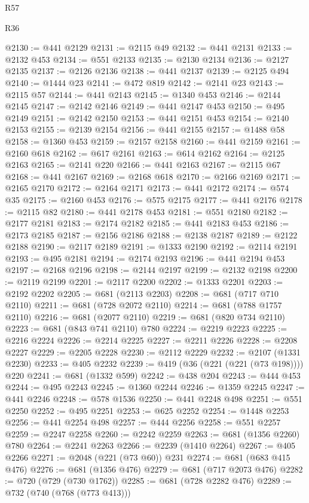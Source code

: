 \begin{lexlean}{R57}
\begin{lexlean}{R36}
\begin{coremodule}
{{{{{{{{{{{{{{{{{{{{{{{{{{{{{{{{{{{{{{{{{{{{{{{{{{{{{{{{{{{{{{{{{{{{{{{{{{{{{{{{{{@2130 := @441 @2129
@2131 := @2115 @49
@2132 := @441 @2131
@2133 := @2132 @453
@2134 := @551 @2133
@2135 := @2130 @2134
@2136 := @2127 @2135
@2137 := @2126 @2136
@2138 := @441 @2137
@2139 := @2125 @494
@2140 := @1444 @23
@2141 := @472 @819
@2142 := @2141 @23
@2143 := @2115 @57
@2144 := @441 @2143
@2145 := @1340 @453
@2146 := @2144 @2145
@2147 := @2142 @2146
@2149 := @441 @2147 @453
@2150 := @495 @2149
@2151 := @2142 @2150
@2153 := @441 @2151 @453
@2154 := @2140 @2153
@2155 := @2139 @2154
@2156 := @441 @2155
@2157 := @1488 @58
@2158 := @1360 @453
@2159 := @2157 @2158
@2160 := @441 @2159
@2161 := @2160 @618
@2162 := @617 @2161
@2163 := @614 @2162
@2164 := @2125 @2163
@2165 := @2141 @220
@2166 := @441 @2163
@2167 := @2115 @67
@2168 := @441 @2167
@2169 := @2168 @618
@2170 := @2166 @2169
@2171 := @2165 @2170
@2172 := @2164 @2171
@2173 := @441 @2172
@2174 := @574 @35
@2175 := @2160 @453
@2176 := @575 @2175
@2177 := @441 @2176
@2178 := @2115 @82
@2180 := @441 @2178 @453
@2181 := @551 @2180
@2182 := @2177 @2181
@2183 := @2174 @2182
@2185 := @441 @2183 @453
@2186 := @2173 @2185
@2187 := @2156 @2186
@2188 := @2138 @2187
@2189 := @2122 @2188
@2190 := @2117 @2189
@2191 := @1333 @2190
@2192 := @2114 @2191
@2193 := @495 @2181
@2194 := @2174 @2193
@2196 := @441 @2194 @453
@2197 := @2168 @2196
@2198 := @2144 @2197
@2199 := @2132 @2198
@2200 := @2119 @2199
@2201 := @2117 @2200
@2202 := @1333 @2201
@2203 := @2192 @2202
@2205 := @681 (@2113 @2203)
@2208 := @681 (@717 @710 @2110)
@2211 := @681 (@728 @2072 @2110)
@2214 := @681 (@788 @1757 @2110)
@2216 := @681 (@2077 @2110)
@2219 := @681 (@820 @734 @2110)
@2223 := @681 (@843 @741 @2110) @780
@2224 := @2219 @2223
@2225 := @2216 @2224
@2226 := @2214 @2225
@2227 := @2211 @2226
@2228 := @2208 @2227
@2229 := @2205 @2228
@2230 := @2112 @2229
@2232 := @2107 (@1331 @2230)
@2233 := @405 @2232
@2239 := @419 (@36 (@221 (@221 (@73 @198)))) @220
@2241 := @681 (@1332 @599)
@2242 := @438 @204
@2243 := @444 @453
@2244 := @495 @2243
@2245 := @1360 @2244
@2246 := @1359 @2245
@2247 := @441 @2246
@2248 := @578 @1536
@2250 := @441 @2248 @498
@2251 := @551 @2250
@2252 := @495 @2251
@2253 := @625 @2252
@2254 := @1448 @2253
@2256 := @441 @2254 @498
@2257 := @444 @2256
@2258 := @551 @2257
@2259 := @2247 @2258
@2260 := @2242 @2259
@2263 := @681 (@1356 @2260) @780
@2264 := @2241 @2263
@2266 := @2239 (@1410 @2264)
@2267 := @405 @2266
@2271 := @2048 (@221 (@73 @60)) @231
@2274 := @681 (@683 @415 @476)
@2276 := @681 (@1356 @476)
@2279 := @681 (@717 @2073 @476)
@2282 := @720 (@729 (@730 @1762))
@2285 := @681 (@728 @2282 @476)
@2289 := @732 (@740 (@768 (@773 @413)))
}}}}}}}}}}}}}}}}}}}}}}}}}}}}}}}}}}}}}}}}}}}}}}}}}}}}}}}}}}}}}}}}}}}}}}}}}}}}}}}}}}
\end{coremodule}
\end{lexlean}
\end{lexlean}
